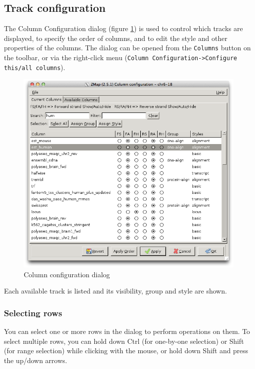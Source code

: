 \documentclass[letterpaper]{article}
\begin{document}
\subsection{Track configuration} \label{sec_track_configuration}
The Column Configuration dialog (figure \ref{img_columns}) is used to control which tracks are displayed, to specify the order of columns, and to edit the style and other properties of the columns.  The dialog can be opened from the \lstinline{Columns} button on the toolbar, or via the right-click menu (\lstinline{Column Configuration->Configure this/all columns}).

\begin{figure}
\centering
\color[rgb]{0.30980393,0.5058824,0.7411765}
\includegraphics[resolution=150]{img_columns.png}
\caption{Column configuration dialog}
\label{img_columns}
\end{figure}

Each available track is listed and its visibility, group and style are shown.

\subsubsection{Selecting rows}
You can select one or more rows in the dialog to perform operations on them. To select multiple rows, you can hold down Ctrl (for one-by-one selection) or Shift (for range selection) while clicking with the mouse, or hold down Shift and press the up/down arrows.
\end{document}
